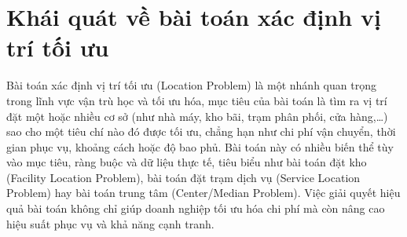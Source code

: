 \section{Khái quát về bài toán xác định vị trí tối ưu}

Bài toán xác định vị trí tối ưu (Location Problem) là một nhánh quan trọng trong lĩnh vực vận trù học và tối ưu hóa, mục tiêu của bài toán là tìm ra vị trí đặt một hoặc nhiều cơ sở (như nhà máy, kho bãi, trạm phân phối, cửa hàng,\ldots) sao cho một tiêu chí nào đó được tối ưu, chẳng hạn như chi phí vận chuyển, thời gian phục vụ, khoảng cách hoặc độ bao phủ. Bài toán này có nhiều biến thể tùy vào mục tiêu, ràng buộc và dữ liệu thực tế, tiêu biểu như bài toán đặt kho (Facility Location Problem), bài toán đặt trạm dịch vụ (Service Location Problem) hay bài toán trung tâm (Center/Median Problem). Việc giải quyết hiệu quả bài toán không chỉ giúp doanh nghiệp tối ưu hóa chi phí mà còn nâng cao hiệu suất phục vụ và khả năng cạnh tranh.